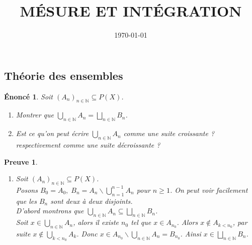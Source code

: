 \documentclass[a4paper, 12pt, french]{article}
\title{MÉSURE ET INTÉGRATION}
\author{}
\date{\today}
\theoremstyle{break}
\newtheorem{enon}{Énoncé}[section]
\newtheorem{preuve}{Preuve}[section]
\begin{document}
\maketitle

\begin{center}\section{Théorie des ensembles}\end{center}
\begin{enon}
       Soit $(A_{n})_{n \in \mathbb{N}} \subseteq P(X)$.
       \begin{enumerate}
               \item Montrer que  $\displaystyle\bigcup_{n \in \mathbb{N}} A_{n} =  \bigsqcup_{n \in \mathbb{N}} B_{n}$.
               \item Est ce qu'on peut écrire  $\displaystyle\bigcup_{n \in \mathbb{N} } A_{n}$ comme une suite croissante ? respectivement comme une suite décroissante ?
       \end{enumerate}
\end{enon}
\begin{preuve}
      \begin{enumerate}
              \item Soit $(A_{n})_{n \in \mathbb{N}} \subseteq P(X)$.\\ Posons $ B_{0}= A_{0}, \; B_{n} = A_{n} \backslash \bigcup_{n=1}^{n-1} A_{n}$ pour $n \geq 1$. On peut voir facilement que les $B_{n}$ sont deux à deux disjoints.\\
              D'abord montrons que $\displaystyle\bigcup_{n \in \mathbb{N}} A_{n} \subseteq \bigsqcup_{n \in \mathbb{N}} B_{n}$.\\
              Soit $ x \in \displaystyle\bigcup_{n \in \mathbb{N}} A_{n}$, alors il existe $n_{0}$ tel que $x \in A_{n_{0}}$. Alors $x \not\in A_{k<n_{0}}$, par suite $x \not\in \displaystyle\bigcup_{k<n_{0}} A_{k}$. Donc $x \in A_{n_{0}} \backslash\displaystyle\bigcup_{n \in \mathbb{N}} A_{n} = B_{n_{0}}$.
              Ainsi $x \in \displaystyle\bigsqcup_{n \in \mathbb{N}} B_{n}$.
      \end{enumerate}
\end{preuve}
\end{document}
